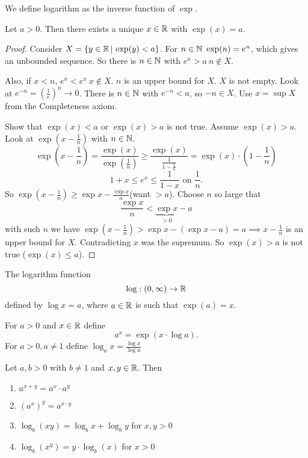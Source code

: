 \documentclass[10pt, a4paper]{article}
\begin{document}
We define logarithm as the inverse function of $\exp$.
\begin{theorem}
    Let $a > 0$.
    Then there exists a unique $x \in \mathbb{R}$ with $\exp(x) = a$.
    \begin{proof}
        Consider $X = \{y \in \mathbb{R}\,|\,\exp(y) < a\}$.
        For $n \in \mathbb{N}\ \exp(n) = e ^ n$,
        which gives an unbounded sequence.
        So there is $n \in \mathbb{N}$ with $e ^ n > a\ n \notin X$.
        
        Also,
        if $x < n$,
        $e ^ n < e ^ x\ x \notin X$.
        $n$ is an upper bound for $X$.
        $X$ is not empty.
        Look at $e ^ {-n} = \left(\frac{1}{e}\right) ^ n \rightarrow 0$.
        There is $n \in \mathbb{N}$ with $e ^ {-n} < a$,
        so $-n \in X$.
        Use $x = \sup X$ from the Completeness axiom.
        
        Show that $\exp(x) < a$ or $\exp(x) > a$ is not true.
        Assume $\exp(x) > a$.
        Look at $\exp\left(x - \frac{1}{n}\right)$ with $n \in \mathbb{N}$.
        \[
        \exp\left(x - \frac{1}{n}\right) = \frac{\exp(x)}{\exp\left(\frac{1}{n}\right)} \geq \frac{\exp(x)}{\frac{1}{1 - \frac{1}{n}}} = \exp(x) \cdot \left(1 - \frac{1}{n}\right)
        \]
        \[
        1 + x \leq e ^ x \leq \frac{1}{1 - x}\text{ on } \frac{1}{n}.
        \]
        So $\exp\left(x - \frac{1}{n}\right) \geq \exp x - \frac{\exp x}{n}$\quad(want $> a$).
        Choose $n$ so large that
        \[
        \frac{\exp x}{n} < \underbrace{\exp x}_{> 0} - a
        \]
        with such $n$ we have $\exp\left(x - \frac{1}{n}\right) > \exp x - (\exp x - a) = a \implies x - \frac{1}{n}$ is an upper bound for $X$. Contradicting $x$ was the supremum.
        So $\exp(x) > a$ is not true ($\exp(x) \leq a$).
    \end{proof}
\end{theorem}

\begin{definition}
    The logarithm function
    \[
    \log : (0, \infty) \rightarrow \mathbb{R}
    \]
    defined by
    $\log x = a$,
    where $a \in \mathbb{R}$ is such that $\exp(a) = x$.
\end{definition}

For $a > 0$ and $x \in \mathbb{R}$ define
\[
a ^ x = \exp(x \cdot \log a).
\]
For $a > 0, a \neq 1$ define $\log_a x = \frac{\log x}{\log a}$

\begin{proposition}
    Let $a, b > 0$ with $b \neq 1$ and $x, y \in \mathbb{R}$.
    Then
    \begin{enumerate}[label = (\alph*)]
        \item $a ^ {x + y} = a ^ x \cdot a ^ y$
        \item $(a ^ x) ^ y = a ^ {x \cdot y}$
        \item $\log_b(xy) = \log_b x + \log_b y$ for $x, y > 0$
        \item $\log_b(x ^ y) = y \cdot \log_b(x)$ for $x > 0$
    \end{enumerate}
\end{proposition}
\end{document}
